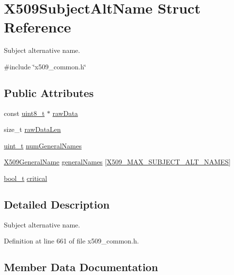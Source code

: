 \hypertarget{structX509SubjectAltName}{}\section{X509\+Subject\+Alt\+Name Struct Reference}
\label{structX509SubjectAltName}


Subject alternative name.  




{\ttfamily \#include \char`\"{}x509\+\_\+common.\+h\char`\"{}}

\subsection*{Public Attributes}
\begin{DoxyCompactItemize}
\item 
const \hyperlink{stdint_8h_aba7bc1797add20fe3efdf37ced1182c5}{uint8\+\_\+t} $\ast$ \hyperlink{structX509SubjectAltName_a7d756442bef6565af58ede9410b2dc77}{raw\+Data}
\item 
size\+\_\+t \hyperlink{structX509SubjectAltName_a87435ad32eda0d4b0a9229028521812b}{raw\+Data\+Len}
\item 
\hyperlink{compiler__port_8h_a12a1e9b3ce141648783a82445d02b58d}{uint\+\_\+t} \hyperlink{structX509SubjectAltName_a320072e6555af4e2bd76d9d154ef7eca}{num\+General\+Names}
\item 
\hyperlink{structX509GeneralName}{X509\+General\+Name} \hyperlink{structX509SubjectAltName_ab4a56143bba771858700f363a8da4647}{general\+Names} \mbox{[}\hyperlink{pkix_2x509__common_8h_ad4b18644ac42bdeede4fe0b1643ce954}{X509\+\_\+\+M\+A\+X\+\_\+\+S\+U\+B\+J\+E\+C\+T\+\_\+\+A\+L\+T\+\_\+\+N\+A\+M\+ES}\mbox{]}
\item 
\hyperlink{compiler__port_8h_a812d16e5494522586b3784e55d479912}{bool\+\_\+t} \hyperlink{structX509SubjectAltName_a9e9447d4bb78391112715c74f6599dbf}{critical}
\end{DoxyCompactItemize}


\subsection{Detailed Description}
Subject alternative name. 

Definition at line 661 of file x509\+\_\+common.\+h.



\subsection{Member Data Documentation}
\mbox{\label{structX509SubjectAltName_a9e9447d4bb78391112715c74f6599dbf}} 
